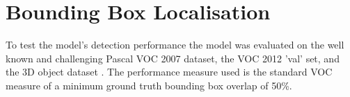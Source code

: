 \begin{table}[]
\caption{Average Precision (AP) on cars of the VOC 2007 \cite{pascal-voc-2007} test set. Results for the model in this project are given in the first two columns and results of other models are provided for comparison.}\label{tab:voc2007}
\end{table}


\section{Bounding Box Localisation}\label{sec:boxloc}
To test the model's detection performance the model was evaluated on the well known and challenging Pascal VOC 2007 \cite{pascal-voc-2007} dataset, the VOC 2012 \cite{pascal-voc-2012} 'val' set, and the 3D object dataset \cite{4408987}.   The performance measure used is the standard VOC measure of a minimum ground truth bounding box overlap of 50\%.

